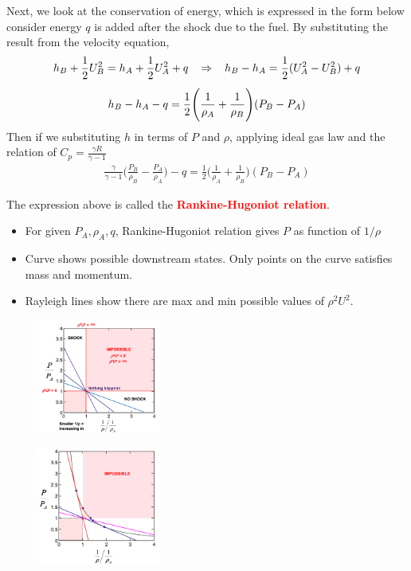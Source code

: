 \documentclass[a4paper,10pt]{article}
\begin{document}
\vspace*{-0.4cm}
Next, we look at the conservation of energy, which is expressed in the form below consider energy $q$ is added after the shock due to the fuel. By substituting the result from the velocity equation, 
\begin{gather*}
    h_B+\frac{1}{2}U_B^2=h_A+\frac{1}{2}U_A^2+q\hspace*{0.3cm}\Rightarrow\hspace*{0.3cm}h_B-h_A = \frac{1}{2}(U_A^2-U_B^2)+q\\[0.15cm]
    h_B-h_A-q=\frac{1}{2}\Bigg(\frac{1}{\rho_A}+\frac{1}{\rho_B}\Bigg)(P_B-P_A)
\end{gather*}
Then if we substituting $h$ in terms of $P$ and $\rho$, applying ideal gas law and the relation of $C_p = \frac{\gamma R}{\gamma-1}$
\begin{gather*}
    \boxed{\frac{\gamma}{\gamma-1}\Bigg(\frac{P_B}{\rho_B}-\frac{P_A}{\rho_A}\Bigg)-q=\frac{1}{2}\Bigg(\frac{1}{\rho_A}+\frac{1}{\rho_B}\Bigg)(P_B-P_A)}
\end{gather*}

The expression above is called the \textcolor{red}{\textbf{Rankine-Hugoniot relation}}.
\begin{itemize}
    \item For given $P_A,\rho_A,q$, Rankine-Hugoniot relation gives $P$ as function of $1/\rho$
    \item Curve shows possible downstream states. Only points on the curve satisfies mass and momentum.
    \item Rayleigh lines show there are max and min possible values of $\rho^2U^2$. 
\end{itemize}

\begin{multicols}{2}
    \begin{figure}[H]
        \centering
        \includegraphics[width=0.36\textwidth]{Figure/rayleigh.png}
    \end{figure}
    \begin{figure}[H]
        \centering
        \includegraphics[width=0.36\textwidth]{Figure/RH.png}
    \end{figure}
\end{multicols}
\end{document}
